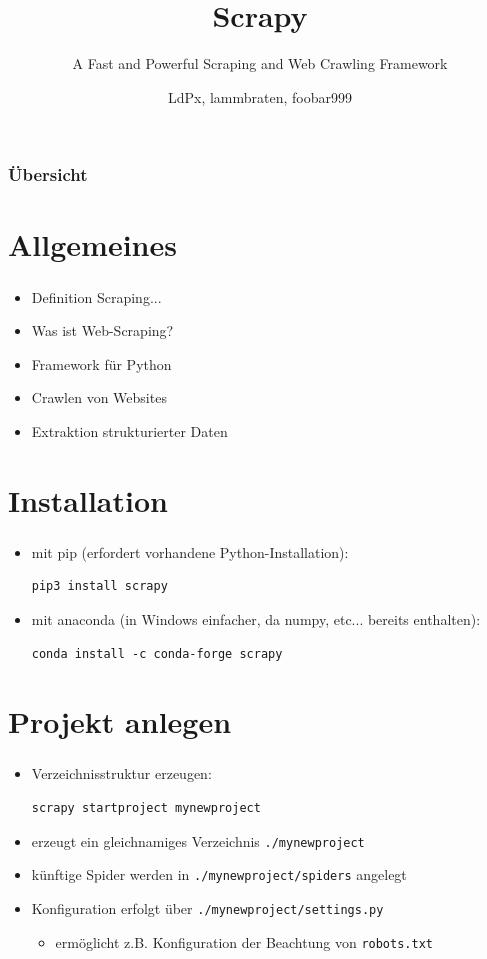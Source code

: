 \documentclass{beamer}
\title{Scrapy}
\subtitle{A Fast and Powerful Scraping and Web Crawling Framework}
\author{LdPx, lammbraten, foobar999}
\begin{document}
\frame{\titlepage}
\begin{frame}
	\frametitle{Übersicht}
	\tableofcontents
\end{frame}
\section{Allgemeines}
\begin{frame}
	\frametitle{\insertsection}
	\begin{itemize}
		\item  Definition Scraping...
		\item  Was ist Web-Scraping?
		\item  Framework für Python
		\item  Crawlen von Websites
		\item  Extraktion strukturierter Daten
	\end{itemize} 
\end{frame}

\section{Installation}
\begin{frame}[fragile]
	\frametitle{\insertsection}
	\begin{itemize}
		\item mit pip (erfordert vorhandene Python-Installation):
			\begin{lstlisting}
pip3 install scrapy
			\end{lstlisting}
		\item mit anaconda (in Windows einfacher, da numpy, etc... bereits enthalten):
			\begin{lstlisting}
conda install -c conda-forge scrapy
			\end{lstlisting}
	\end{itemize}
\end{frame}

\section{Projekt anlegen}
\begin{frame}[fragile]
	\frametitle{\insertsection}
	\begin{itemize}
		\item Verzeichnisstruktur erzeugen:
			\begin{lstlisting}
scrapy startproject mynewproject
			\end{lstlisting}
		\item erzeugt ein gleichnamiges Verzeichnis \verb|./mynewproject| 
		\item künftige Spider werden in \verb|./mynewproject/spiders| angelegt
		\item Konfiguration erfolgt über \verb|./mynewproject/settings.py|
		\begin{itemize}
		  \item ermöglicht z.B. Konfiguration der Beachtung von \lstinline|robots.txt|
  		\end{itemize}
	\end{itemize}
\end{frame}
\end{document}
